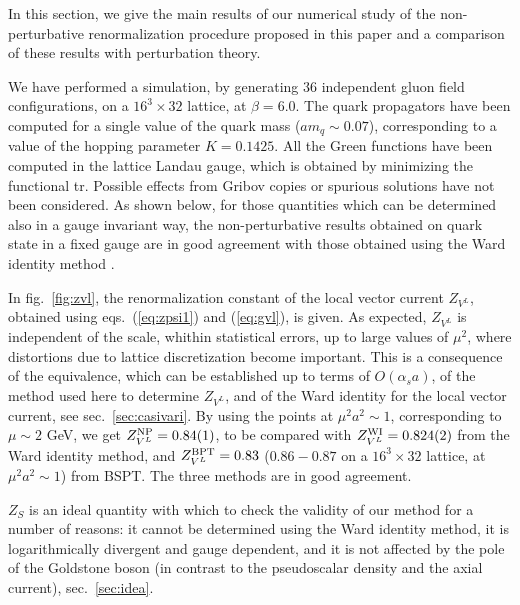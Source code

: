 In this  section, we give the main results of our numerical study of the
non-perturbative renormalization procedure proposed in this paper and a
comparison
of these results with perturbation theory.

We have performed a
simulation, by generating $36$ independent gluon field configurations,
on a $16^3 \times 32$ lattice, at $\beta=6.0$. The quark propagators have been
computed for a single value of the quark mass ($am_q \sim 0.07$),
 corresponding to a value of the hopping parameter  $K=0.1425$.
All the Green functions have been computed in the lattice Landau
gauge, which  is obtained by
minimizing the functional \beq
{\rm tr}\Bigl[ \sum_{\mu=1}^{4}\Bigl(U_{\mu}(x)+
U^{\dagger}_{\mu}(x)\Bigr)\Bigr].
\eeq
Possible effects from Gribov copies or spurious solutions \cite{giusti} have
not been considered.
As shown below, for those quantities which can be determined also
in a gauge invariant
way, the non-perturbative results obtained
on quark state  in a fixed gauge  are in
good agreement with  those  obtained using the Ward
identity method  \cite{wi}.


In fig.\ \ref{fig:zvl}, the renormalization constant of the local vector current
$Z_{V^L}$, obtained using eqs.\ (\ref{eq:zpsi1}) and (\ref{eq:gvl}), is given.
As expected, $Z_{V^L}$ is independent of the scale,
whithin  statistical errors, up to large values of $\mu^2$, where distortions
due to lattice discretization become important.
This is a consequence of  the
equivalence, which can be established up to terms of $O(\alpha_s a)$, of the
method used here to determine $Z_{V^L}$, and
of the Ward identity for the local vector current, see sec.\ \ref{sec:casivari}.
By using the points at $\mu^2 a^2 \sim 1$, corresponding to $\mu \sim 2$ GeV,
we get $Z^{{\rm NP}}_{V^L}=0.84(1)$, to be compared with
$Z^{{\rm WI}}_{V^L}=0.824(2)$  from the Ward identity method, and
$Z^{{\rm BPT}}_{V^L}=0.83$ ($0.86-0.87$ on a $16^3 \times 32$ lattice,
at $\mu^2 a^2 \sim 1$) from BSPT.  The three
methods are in good agreement.


$Z_S$ is an ideal quantity with which to check the validity of
our method for a number of reasons:
it cannot be determined using the Ward identity method, it
is logarithmically divergent and gauge dependent, and
it is not affected by the pole of the Goldstone boson (in contrast to
the pseudoscalar density and the axial current), sec.\ \ref{sec:idea}.

